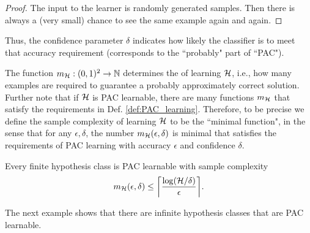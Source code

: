 \documentclass[11pt,a4paper]{article}
\begin{document}
\begin{proof}
The input to the learner is randomly generated samples. Then there is always a (very small) chance to see the same example again and again.
\end{proof}

Thus, the confidence parameter $\delta$ indicates how likely the classifier is to meet that accuracy requirement (corresponds to the ``probably" part of ``PAC").

\begin{remark}
The function $m_{\mathcal{H}}:(0,1)^2\rightarrow \mathbb{N}$ determines the  of learning $\mathcal{H}$, i.e., how many examples are required to guarantee a probably approximately correct solution. Further note that if $\mathcal{H}$ is PAC learnable, there are many functions $m_{\mathcal{H}}$ that satisfy the requirements in Def. \ref{def:PAC_learning}. Therefore, to be precise we define the sample complexity of learning $\mathcal{H}$ to be the ``minimal function", in the sense that for any $\epsilon, \delta$, the number $m_{\mathcal{H}}(\epsilon,\delta)$ is minimal that satisfies the requirements of PAC learning with accuracy $\epsilon$ and confidence $\delta$.
\end{remark}

\begin{corollary}
Every finite hypothesis class is PAC learnable with sample complexity 
\begin{equation*}
m_{\mathcal{H}}(\epsilon,\delta) \le \bigg\lceil \dfrac{\log(\mathcal{H}/\delta)}{\epsilon} \bigg\rceil.
\end{equation*}
\end{corollary}

The next example shows that there are infinite hypothesis classes that are PAC learnable.
\end{document}
